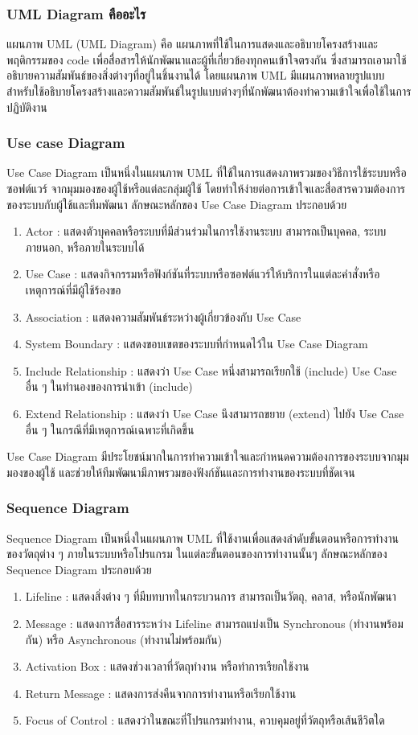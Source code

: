\documentclass[14pt,oneside,openright,a4paper]{cpe-thai-project}
\begin{document}
\subsubsection{UML Diagram คืออะไร}
แผนภาพ UML \cite{UML} (UML Diagram) คือ แผนภาพที่ใช้ในการแสดงและอธิบายโครงสร้างและพฤติกรรมของ code เพื่อสื่อสารให้นักพัฒนาและผู้ที่เกี่ยวข้องทุกคนเข้าใจตรงกัน ซึ่งสามารถเอามาใช้อธิบายความสัมพันธ์ของสิ่งต่างๆที่อยู่ในชิ้นงานได้ โดยแผนภาพ UML มีแผนภาพหลายรูปแบบสำหรับใช้อธิบายโครงสร้างและความสัมพันธ์ในรูปแบบต่างๆที่นักพัฒนาต้องทำความเข้าใจเพื่อใช้ในการปฏิบัติงาน
\subsubsection{Use case Diagram}
Use Case Diagram เป็นหนึ่งในแผนภาพ UML ที่ใช้ในการแสดงภาพรวมของวิธีการใช้ระบบหรือซอฟต์แวร์ จากมุมมองของผู้ใช้หรือแต่ละกลุ่มผู้ใช้ โดยทำให้ง่ายต่อการเข้าใจและสื่อสารความต้องการของระบบกับผู้ใช้และทีมพัฒนา
ลักษณะหลักของ Use Case Diagram ประกอบด้วย
\begin{enumerate}
  \item Actor : แสดงตัวบุคคลหรือระบบที่มีส่วนร่วมในการใช้งานระบบ สามารถเป็นบุคคล, ระบบภายนอก, หรือภายในระบบได้
  \item Use Case : แสดงกิจกรรมหรือฟังก์ชันที่ระบบหรือซอฟต์แวร์ให้บริการในแต่ละคำสั่งหรือเหตุการณ์ที่มีผู้ใช้ร้องขอ
  \item Association : แสดงความสัมพันธ์ระหว่างผู้เกี่ยวข้องกับ Use Case
  \item System Boundary : แสดงขอบเขตของระบบที่กำหนดไว้ใน Use Case Diagram
  \item Include Relationship : แสดงว่า Use Case หนึ่งสามารถเรียกใช้ (include) Use Case อื่น ๆ ในทำนองของการนำเข้า (include)
  \item Extend Relationship : แสดงว่า Use Case นึงสามารถขยาย (extend) ไปยัง Use Case อื่น ๆ ในกรณีที่มีเหตุการณ์เฉพาะที่เกิดขึ้น
\end{enumerate}
  Use Case Diagram มีประโยชน์มากในการทำความเข้าใจและกำหนดความต้องการของระบบจากมุมมองของผู้ใช้ และช่วยให้ทีมพัฒนามีภาพรวมของฟังก์ชันและการทำงานของระบบที่ชัดเจน
\subsubsection{Sequence Diagram}
  Sequence Diagram เป็นหนึ่งในแผนภาพ UML ที่ใช้งานเพื่อแสดงลำดับขั้นตอนหรือการทำงานของวัตถุต่าง ๆ ภายในระบบหรือโปรแกรม ในแต่ละขั้นตอนของการทำงานนั้นๆ
  ลักษณะหลักของ Sequence Diagram ประกอบด้วย

    \begin{enumerate}
      \item Lifeline : แสดงสิ่งต่าง ๆ ที่มีบทบาทในกระบวนการ สามารถเป็นวัตถุ, คลาส, หรือนักพัฒนา
      \item Message : แสดงการสื่อสารระหว่าง Lifeline สามารถแบ่งเป็น Synchronous (ทำงานพร้อมกัน) หรือ Asynchronous (ทำงานไม่พร้อมกัน)
      \item Activation Box : แสดงช่วงเวลาที่วัตถุทำงาน หรือทำการเรียกใช้งาน
      \item Return Message : แสดงการส่งคืนจากการทำงานหรือเรียกใช้งาน
      \item Focus of Control : แสดงว่าในขณะที่โปรแกรมทำงาน, ควบคุมอยู่ที่วัตถุหรือเส้นชีวิตใด
    \end{enumerate}
\end{document}
